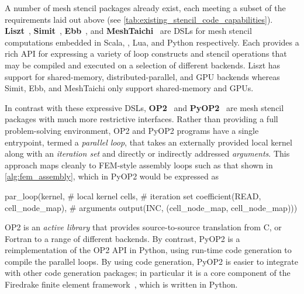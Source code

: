 \documentclass[thesis]{subfiles}
\begin{document}

A number of mesh stencil packages already exist, each meeting a subset of the requirements laid out above (see \cref{tab:existing_stencil_code_capabilities}).
\textbf{Liszt}~\cite{devitoLisztDomainSpecific2011}, \textbf{Simit}~\cite{kjolstadSimitLanguagePhysical2016}, \textbf{Ebb}~\cite{bernsteinEbbDSLPhysical2016}, and \textbf{MeshTaichi}~\cite{yuMeshTaichiCompilerEfficient2022} are DSLs for mesh stencil computations embedded in Scala, \cplusplus, Lua, and Python respectively.
Each provides a rich API for expressing a variety of loop constructs and stencil operations that may be compiled and executed on a selection of different backends.
Liszt has support for shared-memory, distributed-parallel, and GPU backends whereas Simit, Ebb, and MeshTaichi only support shared-memory and GPUs.

In contrast with these expressive DSLs, \textbf{OP2}~\cite{mudaligeOP2ActiveLibrary2012} and \textbf{PyOP2}~\cite{rathgeberPyOP2HighLevelFramework2012} are mesh stencil packages with much more restrictive interfaces.
Rather than providing a full problem-solving environment, OP2 and PyOP2 programs have a single entrypoint, termed a \textit{parallel loop}, that takes an externally provided local kernel along with an \textit{iteration set} and directly or indirectly addressed \textit{arguments}.
This approach maps cleanly to FEM-style assembly loops such as that shown in \cref{alg:fem_assembly}, which in PyOP2 would be expressed as

\begin{pyinline}
  par_loop(kernel,                                       # local kernel
           cells,                                        # iteration set
           coefficient(READ, cell_node_map),             # arguments
           output(INC, (cell_node_map, cell_node_map)))
\end{pyinline}

OP2 is an \textit{active library} that provides source-to-source translation from C, \cplusplus or Fortran to a range of different backends.
By contrast, PyOP2 is a reimplementation of the OP2 API in Python, using run-time code generation to compile the parallel loops.
By using code generation, PyOP2 is easier to integrate with other code generation packages; in particular it is a core component of the Firedrake finite element framework~\cite{FiredrakeUserManual}, which is written in Python.
\end{document}
